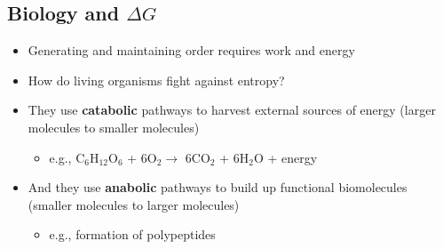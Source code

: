 \documentclass[10pt]{article}
\begin{document}
\subsection*{Biology and $\Delta G$}
\begin{itemize}
    \item Generating and maintaining order requires work and energy
    \item How do living organisms fight against entropy?
    \item They use \textbf{catabolic} pathways to harvest external sources of energy (larger molecules to smaller molecules)
    \begin{itemize}
        \item e.g., C$_6$H$_{12}$O$_6$ + 6O$_2 \rightarrow$ 6CO$_2$ + 6H$_2$O + energy
    \end{itemize}
    \item And they use \textbf{anabolic} pathways to build up functional biomolecules (smaller molecules to larger molecules)
    \begin{itemize}
        \item e.g., formation of polypeptides
    \end{itemize}
\end{itemize}
\end{document}
